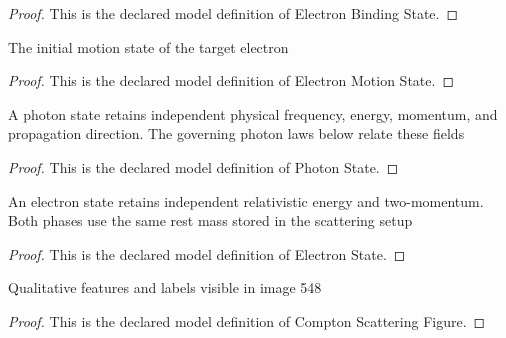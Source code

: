 \begin{proof}
  This is the declared model definition of Electron Binding State.
\end{proof}
\begin{definition}
  \label{def:physics:phyx-mini-0548:phyxminiproblems-problemphyxmini0548-electronmotionstate}
  The initial motion state of the target electron
\end{definition}
\begin{proof}
  This is the declared model definition of Electron Motion State.
\end{proof}
\begin{definition}
  \label{def:physics:phyx-mini-0548:phyxminiproblems-problemphyxmini0548-photonstate}
  A photon state retains independent physical frequency, energy, momentum, and propagation direction. The governing photon laws below relate these fields
\end{definition}
\begin{proof}
  This is the declared model definition of Photon State.
\end{proof}
\begin{definition}
  \label{def:physics:phyx-mini-0548:phyxminiproblems-problemphyxmini0548-electronstate}
  An electron state retains independent relativistic energy and two-momentum. Both phases use the same rest mass stored in the scattering setup
\end{definition}
\begin{proof}
  This is the declared model definition of Electron State.
\end{proof}
\begin{definition}
  \label{def:physics:phyx-mini-0548:phyxminiproblems-problemphyxmini0548-comptonscatteringfigure}
  Qualitative features and labels visible in image 548
\end{definition}
\begin{proof}
  This is the declared model definition of Compton Scattering Figure.
\end{proof}
